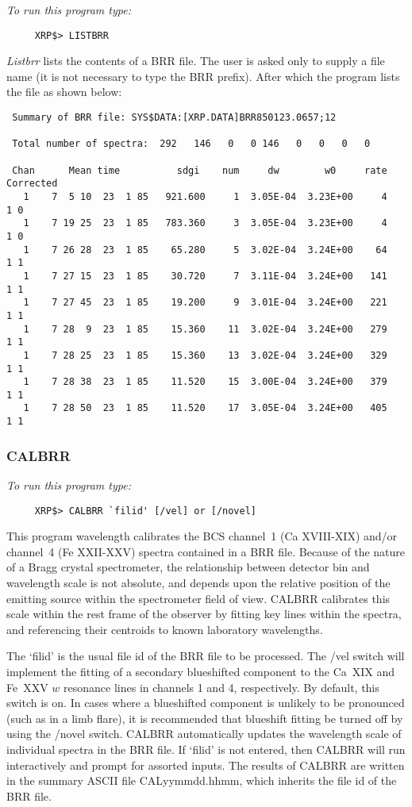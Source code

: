 {\em To run this program type:}
\begin{verbatim}
     XRP$> LISTBRR                       
\end{verbatim}
  {\em Listbrr} lists the contents of a BRR file. The user is asked  
   only to supply a file name (it is not necessary to type the BRR prefix).
   After which the program lists the file as shown below:
\begin{verbatim}
 Summary of BRR file: SYS$DATA:[XRP.DATA]BRR850123.0657;12              

 Total number of spectra:  292   146   0   0 146   0   0   0   0

 Chan      Mean time          sdgi    num     dw        w0     rate Corrected
   1    7  5 10  23  1 85   921.600     1  3.05E-04  3.23E+00     4    1 0
   1    7 19 25  23  1 85   783.360     3  3.05E-04  3.23E+00     4    1 0
   1    7 26 28  23  1 85    65.280     5  3.02E-04  3.24E+00    64    1 1
   1    7 27 15  23  1 85    30.720     7  3.11E-04  3.24E+00   141    1 1
   1    7 27 45  23  1 85    19.200     9  3.01E-04  3.24E+00   221    1 1
   1    7 28  9  23  1 85    15.360    11  3.02E-04  3.24E+00   279    1 1
   1    7 28 25  23  1 85    15.360    13  3.02E-04  3.24E+00   329    1 1
   1    7 28 38  23  1 85    11.520    15  3.00E-04  3.24E+00   379    1 1
   1    7 28 50  23  1 85    11.520    17  3.05E-04  3.24E+00   405    1 1
\end{verbatim}

\subsubsection{CALBRR}

{\em To run this program type:}
\begin{verbatim}
     XRP$> CALBRR `filid' [/vel] or [/novel]                 
\end{verbatim}
This program wavelength calibrates the BCS channel~1 (Ca XVIII-XIX) and/or
channel~4 (Fe XXII-XXV) spectra contained in a BRR file. Because of the nature
of a Bragg crystal spectrometer, the relationship between detector bin and
wavelength scale is not absolute, and depends upon the relative  position of
the  emitting source within the spectrometer field of view.  CALBRR calibrates
this scale within the rest frame of the observer by fitting key lines within
the spectra, and referencing their centroids to known laboratory wavelengths.

The `filid' is the usual file id of the BRR file to be processed.
The /vel switch will implement the fitting of a secondary blueshifted
component to the Ca~XIX and Fe~XXV $w$ resonance lines in channels 1 and 4,
respectively. By default, this switch is on. In cases where a blueshifted
component is unlikely to be pronounced (such as in a limb flare), it is
recommended that blueshift fitting be turned off by using the /novel switch.
CALBRR automatically updates the wavelength scale  of individual spectra in the
BRR file. If `filid' is not entered, then CALBRR will run interactively and
prompt for assorted inputs. The results of CALBRR are written in the summary
ASCII file  CALyymmdd.hhmm, which inherits the file id of the BRR file.   

